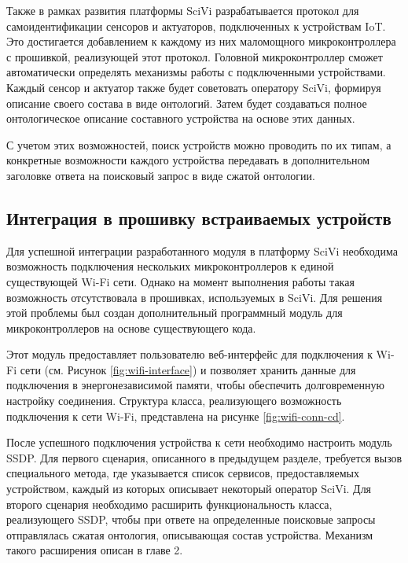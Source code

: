 Также в рамках развития платформы SciVi разрабатывается протокол для самоидентификации сенсоров и актуаторов, подключенных к устройствам IoT.
Это достигается добавлением к каждому из них маломощного микроконтроллера с прошивкой, реализующей этот протокол.
Головной микроконтроллер сможет автоматически определять механизмы работы с подключенными устройствами.
Каждый сенсор и актуатор также будет советовать оператору SciVi, формируя описание своего состава в виде онтологий.
Затем будет создаваться полное онтологическое описание составного устройства на основе этих данных.

С учетом этих возможностей, поиск устройств можно проводить по их типам, а конкретные возможности каждого устройства передавать в дополнительном заголовке ответа на поисковый запрос в виде сжатой онтологии.

\subsection{Интеграция в прошивку встраиваемых устройств}

Для успешной интеграции разработанного модуля в платформу SciVi необходима возможность подключения нескольких микроконтроллеров к единой существующей Wi-Fi сети.
Однако на момент выполнения работы такая возможность отсутствовала в прошивках, используемых в SciVi.
Для решения этой проблемы был создан дополнительный программный модуль для микроконтроллеров на основе существующего кода.

Этот модуль предоставляет пользователю веб-интерфейс для подключения к Wi-Fi сети (см.
Рисунок \ref{fig:wifi-interface}) и позволяет хранить данные для подключения в энергонезависимой памяти, чтобы обеспечить долговременную настройку соединения.
Структура класса, реализующего возможность подключения к сети Wi-Fi, представлена на рисунке \ref{fig:wifi-conn-cd}.



После успешного подключения устройства к сети необходимо настроить модуль SSDP.
Для первого сценария, описанного в предыдущем разделе, требуется вызов специального метода, где указывается список сервисов, предоставляемых устройством, каждый из которых описывает некоторый оператор SciVi.
Для второго сценария необходимо расширить функциональность класса, реализующего SSDP, чтобы при ответе на определенные поисковые запросы отправлялась сжатая онтология, описывающая состав устройства.
Механизм такого расширения описан в главе 2.

